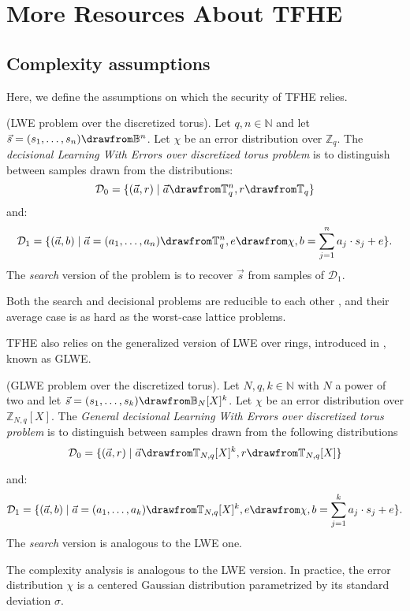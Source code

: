\section{More Resources About \gls{TFHE}}
\label{sec:appendix_fhe}


\subsection{Complexity assumptions}
\label{sec:complexity_assumptions}

Here, we define the assumptions on which the security of \gls{TFHE} relies. 

\begin{definition}
	(LWE problem over the discretized torus). Let $q, n \in \mathbb N$ and let $\vec s = (s_1, \dots, s_n) \drawfrom \mathbb B^n$. Let $\chi$ be an error distribution over $\mathbb Z_q$. The \emph{decisional Learning With Errors over discretized torus problem} is to distinguish between samples drawn from the distributions: 
	\[
	\mathcal{D}_0 = \{(\vec a, r)\mid\vec a \drawfrom \mathbb T_q^n, r \drawfrom \mathbb T_q\}
	\] and: \[
	\mathcal{D}_1 = \{(\vec a, b)\mid\vec a = (a_1, \dots, a_n) \drawfrom \mathbb T_q^n, e \drawfrom \chi, b = \sum_{j=1}^n a_j \cdot s_j + e\}.
	\]
	The \emph{search} version of the problem is to recover $\vec s$ from samples of $\mathcal{D}_1$.
	\label{def:LWE}
\end{definition}
Both the search and decisional problems are reducible to each other \cite{Regev}, and their average case is as hard as the worst-case lattice problems.


\gls{TFHE} also relies on the generalized version of LWE over rings, introduced in \cite{ITCS:BraGenVai12}, known as GLWE.

\begin{definition}
	(GLWE problem over the discretized torus). Let $N, q, k \in \mathbb N$ with $N$ a power of two and let $\vec s = (s_1, \dots, s_k) \drawfrom \mathbb B_N[X]^k$. Let $\chi$ be an error distribution over $\mathbb Z_{N, q}[X]$. The \emph{General decisional Learning With Errors over discretized torus problem} is to distinguish between samples drawn from the following distributions 
	\[
		\mathcal{D}_0 = \{(\vec a, r) \mid \vec a \drawfrom \mathbb T_{N, q}[X]^k, r \drawfrom \mathbb T_{N, q}[X]\}
		\]
		
		and: \[\mathcal{D}_1 = \{(\vec a, b) \mid \vec a = (a_1, \dots, a_k) \drawfrom \mathbb T_{N, q}[X]^k, e \drawfrom \chi, b = \sum_{j=1}^k a_j \cdot s_j + e\}.
	\]
	\label{def:GLWE}
	The \emph{search} version is analogous to the LWE one.
\end{definition}
%
The complexity analysis is analogous to the LWE version.
In practice, the error distribution $\chi$ is a centered Gaussian distribution parametrized by its standard deviation $\sigma$.





